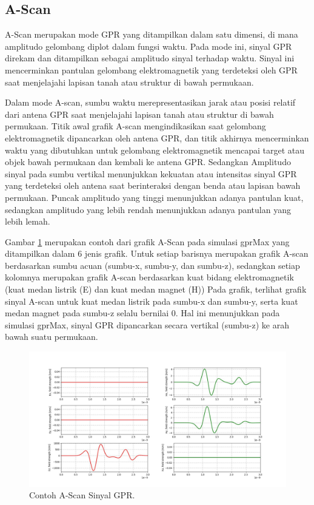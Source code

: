 \subsection{A-Scan}
\label{subsec:aScan}

A-Scan merupakan mode GPR yang ditampilkan dalam satu dimensi, di mana amplitudo gelombang diplot dalam fungsi waktu. 
Pada mode ini, sinyal GPR direkam dan ditampilkan sebagai amplitudo sinyal terhadap waktu. 
Sinyal ini mencerminkan pantulan gelombang elektromagnetik yang terdeteksi oleh GPR saat menjelajahi lapisan tanah atau struktur di bawah permukaan.

Dalam mode A-scan, sumbu waktu merepresentasikan jarak atau posisi relatif dari antena GPR saat menjelajahi lapisan tanah atau struktur di bawah permukaan. 
Titik awal grafik A-scan mengindikasikan saat gelombang elektromagnetik dipancarkan oleh antena GPR, dan titik akhirnya mencerminkan waktu yang dibutuhkan untuk gelombang elektromagnetik mencapai target atau objek bawah permukaan dan kembali ke antena GPR.
Sedangkan Amplitudo sinyal pada sumbu vertikal menunjukkan kekuatan atau intensitas sinyal GPR yang terdeteksi oleh antena saat berinteraksi dengan benda atau lapisan bawah permukaan. 
Puncak amplitudo yang tinggi menunjukkan adanya pantulan kuat, sedangkan amplitudo yang lebih rendah menunjukkan adanya pantulan yang lebih lemah.

Gambar \ref{fig:AscanGPR} merupakan contoh dari grafik A-Scan pada simulasi gprMax yang ditampilkan dalam 6 jenis grafik. 
Untuk setiap barisnya merupakan grafik A-scan berdasarkan sumbu acuan (sumbu-x, sumbu-y, dan sumbu-z), sedangkan setiap kolomnya merupakan grafik A-scan berdasarkan kuat bidang elektromagnetik (kuat medan listrik (E) dan kuat medan magnet (H))
Pada grafik, terlihat grafik sinyal A-scan untuk kuat medan listrik pada sumbu-x dan sumbu-y, serta kuat medan magnet pada sumbu-z selalu bernilai 0.
Hal ini menunjukkan pada simulasi gprMax, sinyal GPR dipancarkan secara vertikal (sumbu-z) ke arah bawah suatu permukaan.

\begin{figure}[ht]
  \centering
  \includegraphics[scale=0.45]{gambar/GPRAscan.jpeg}
  \caption{Contoh A-Scan Sinyal GPR.}
  \label{fig:AscanGPR}
\end{figure}

